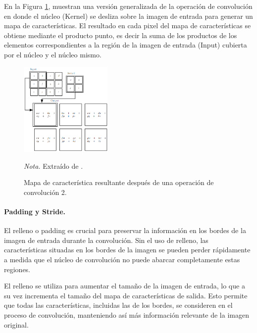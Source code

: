 En la Figura \ref{fig:feature_map}, \citet{Goodfellow-et-al-2016} muestran una versión generalizada de la operación de convolución en donde el núcleo (Kernel) se desliza sobre la imagen de entrada para generar un mapa de características.
El resultado en cada pixel del mapa de características se obtiene mediante el producto punto, es decir la suma de los productos de los elementos correspondientes a la región de la imagen de entrada (Input) cubierta por el núcleo y el núcleo mismo.

\begin{figure}[H]
    \centering
    \caption{Mapa de característica resultante después de una operación de convolución 2.}
    \includegraphics[width=0.4\textwidth]{img/4_marco_teorico/feature_map.png}
    \label{fig:feature_map}
    \begin{flushleft}
        \textit{Nota.} Extraído de \citet{Goodfellow-et-al-2016}. 
        \vspace{-\baselineskip}       
    \end{flushleft}
\end{figure}

\paragraph{Padding y Stride.}
El relleno o padding es crucial para preservar la información en los bordes de la imagen de entrada durante la convolución. Sin el uso de relleno, las características situadas en los bordes de la imagen se pueden perder 
rápidamente a medida que el núcleo de convolución no puede abarcar completamente estas regiones. 

El relleno se utiliza para aumentar el tamaño de la imagen de entrada, lo que a su vez incrementa el tamaño del mapa de 
características de salida. Esto permite que todas las características, incluidas las de los bordes, se consideren en el proceso de convolución, manteniendo así más información relevante de la imagen original.

